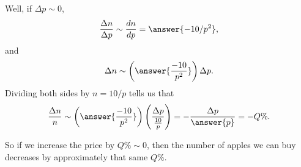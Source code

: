 \documentclass{ximera}
\begin{document}
\begin{question}
\begin{enumerate}
Well, if $\Delta p \sim 0$,
\[
    \frac{\Delta n}{\Delta p}   \sim  \frac{dn}{dp} = \answer{-10/p^2},
\]
and
\[
     \Delta n \sim \left( \answer{\frac{-10}{p^2}} \right) \Delta p.
\]
Dividing both sides by $n = 10/p$ tells us that
\[
        \frac{\Delta n}{n} \sim \left( \answer{\frac{-10}{p^2}} \right)\left( \frac{\Delta p}{\frac{10}{p}} \right) = -\frac{\Delta p}{\answer{p}} = -Q\%.
\]

So if we increase the price by $Q\%\sim 0$, then the number of apples we can buy decreases by approximately that same $Q\%$.

\end{enumerate}



\end{question}
\end{document}
